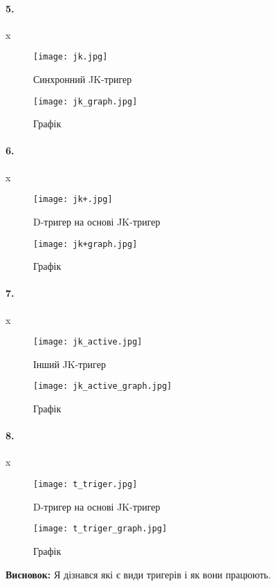 \documentclass[12pt]{extarticle}
\begin{document}
\paragraph{5.}x
\begin{figure}[H]
    \centering
    \texttt{[image: jk.jpg]}
    \caption{Синхронний JK-тригер}
\end{figure}
\begin{figure}[H]
    \centering
    \texttt{[image: jk\_graph.jpg]}
    \caption{Графік}
\end{figure}
\paragraph{6.}x
\begin{figure}[H]
    \centering
    \texttt{[image: jk+.jpg]}
    \caption{D-тригер на основі JK-тригер}
\end{figure}
\begin{figure}[H]
    \centering
    \texttt{[image: jk+graph.jpg]}
    \caption{Графік}
\end{figure}
\paragraph{7.}x
\begin{figure}[H]
    \centering
    \texttt{[image: jk\_active.jpg]}
    \caption{Інший JK-тригер}
\end{figure}
\begin{figure}[H]
    \centering
    \texttt{[image: jk\_active\_graph.jpg]}
    \caption{Графік}
\end{figure}
\paragraph{8.}x
\begin{figure}[H]
    \centering
    \texttt{[image: t\_triger.jpg]}
    \caption{D-тригер на основі JK-тригер}
\end{figure}
\begin{figure}[H]
    \centering
    \texttt{[image: t\_triger\_graph.jpg]}
    \caption{Графік}
\end{figure}

\textbf{Висновок:} Я дізнався які є види тригерів і як вони працюють.
\end{document}
